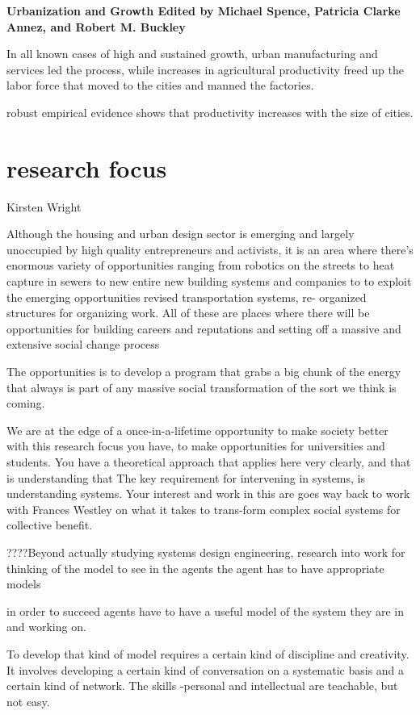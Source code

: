  \vspace{1cm}
\textbf{Urbanization and Growth Edited by Michael Spence, Patricia Clarke Annez, and Robert M. Buckley}

 In all known cases of high and sustained growth, urban manufacturing and services led the process, while increases in agricultural productivity freed up the labor force that moved to the cities and manned the factories. 

 robust empirical evidence shows that productivity increases with the size of cities. 

{\color{red}
 \section{research focus}

 Kirsten Wright

Although the housing and urban design sector is emerging and largely unoccupied by high quality entrepreneurs and activists, it is an area where there's enormous variety of opportunities ranging from robotics on the streets to heat capture  in sewers to new entire new building systems and companies to to exploit the emerging opportunities revised transportation systems, re- organized structures for organizing work. All of these are places where there will be opportunities for building careers and reputations and setting off a massive and extensive social change process

The opportunities is to  develop a program that grabs a big chunk of the energy that always is part of any massive social transformation of the sort we think is coming.


We are at the edge of a once-in-a-lifetime opportunity to make society better with this research focus you have, to make opportunities for universities and students. You have a theoretical approach that applies here very clearly, and that is understanding that The key requirement for  intervening in systems,  is understanding systems. Your interest and work in this are goes way back to work with  Frances Westley on what it takes to trans-form complex social systems for collective benefit. 

????Beyond actually studying systems design engineering,  research into work for thinking of the model to see in the agents the agent has to have  appropriate models 

in order to succeed agents have to have a useful model of the system they are in and working on. 

To develop that kind of model  requires a certain kind of discipline and creativity. It involves developing a certain kind of conversation on a systematic basis and a certain kind of network. The skills -personal and intellectual are teachable, but not easy.
}